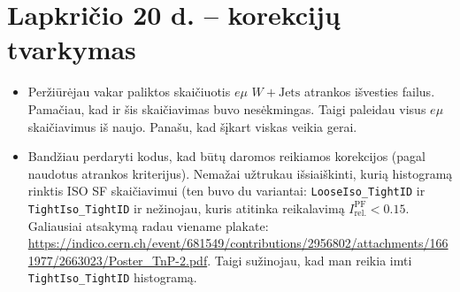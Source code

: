 \documentclass[a4paper, 12pt]{article}
\newcommand{\WJets}{W\! +\!\mathrm{Jets}}
\newcommand{\emu}{e\mu}
\newcommand{\ttt}[1]{\texttt{#1}}
\begin{document}
\section{Lapkričio 20 d. -- korekcijų tvarkymas}
\begin{itemize}
	\item Peržiūrėjau vakar paliktos skaičiuotis $\emu$ $\WJets$ atrankos išvesties failus. Pamačiau, kad
	ir šis skaičiavimas buvo nesėkmingas. Taigi paleidau visus $\emu$ skaičiavimus iš naujo. Panašu, kad
	šįkart viskas veikia gerai.
	\item Bandžiau perdaryti kodus, kad būtų daromos reikiamos korekcijos (pagal naudotus atrankos kriterijus).
	Nemažai užtrukau išsiaiškinti, kurią histogramą rinktis ISO SF skaičiavimui (ten buvo du variantai:
	\ttt{LooseIso\_TightID} ir \ttt{TightIso\_TightID} ir nežinojau, kuris atitinka reikalavimą
	$I^{\mathrm{PF}}_{\mathrm{rel.}} < 0.15$. Galiausiai atsakymą radau viename plakate:
	\url{https://indico.cern.ch/event/681549/contributions/2956802/attachments/1661977/2663023/Poster_TnP-2.pdf}.
	Taigi sužinojau, kad man reikia imti \ttt{TightIso\_TightID} histogramą.
\end{itemize}




\end{document}
